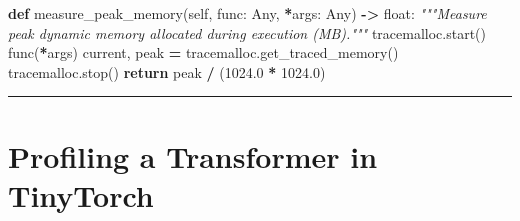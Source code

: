 \documentclass[
  letterpaper,
]{scrbook}
\newenvironment{Shaded}{\begin{snugshade}}{\end{snugshade}}
\newcommand{\BuiltInTok}[1]{#1}
\newcommand{\CommentTok}[1]{\textcolor[rgb]{0.56,0.35,0.01}{\textit{#1}}}
\newcommand{\ControlFlowTok}[1]{\textcolor[rgb]{0.13,0.29,0.53}{\textbf{#1}}}
\newcommand{\FloatTok}[1]{\textcolor[rgb]{0.00,0.00,0.81}{#1}}
\newcommand{\KeywordTok}[1]{\textcolor[rgb]{0.13,0.29,0.53}{\textbf{#1}}}
\newcommand{\NormalTok}[1]{#1}
\newcommand{\OperatorTok}[1]{\textcolor[rgb]{0.81,0.36,0.00}{\textbf{#1}}}
\newcommand{\VariableTok}[1]{\textcolor[rgb]{0.00,0.00,0.00}{#1}}
\begin{document}
\begin{Shaded}
\begin{Highlighting}[]
    \KeywordTok{def}\NormalTok{ measure\_peak\_memory(}\VariableTok{self}\NormalTok{, func: Any, }\OperatorTok{*}\NormalTok{args: Any) }\OperatorTok{{-}\textgreater{}} \BuiltInTok{float}\NormalTok{:}
        \CommentTok{"""Measure peak dynamic memory allocated during execution (MB)."""}
\NormalTok{        tracemalloc.start()}
\NormalTok{        func(}\OperatorTok{*}\NormalTok{args)}
\NormalTok{        current, peak }\OperatorTok{=}\NormalTok{ tracemalloc.get\_traced\_memory()}
\NormalTok{        tracemalloc.stop()}
        \ControlFlowTok{return}\NormalTok{ peak }\OperatorTok{/}\NormalTok{ (}\FloatTok{1024.0} \OperatorTok{*} \FloatTok{1024.0}\NormalTok{)}
\end{Highlighting}
\end{Shaded}

\begin{center}\rule{0.5\linewidth}{0.5pt}\end{center}

\section{Profiling a Transformer in
TinyTorch}\label{profiling-a-transformer-in-tinytorch}
\end{document}

